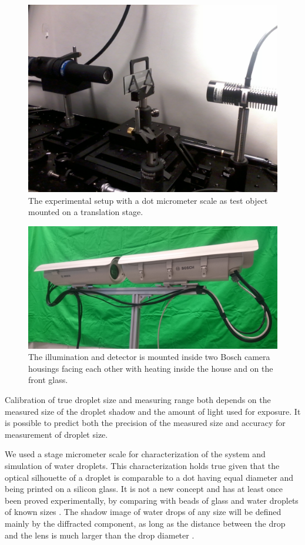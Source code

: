 \begin{figure}[ht]
\centering\includegraphics[width=0.75\linewidth]{figures/Foto0169}
\caption{The experimental setup with a dot micrometer scale as test object mounted on a translation stage.}
\end{figure}

\begin{figure}[ht]
\centering\includegraphics[width=0.75\linewidth]{figures/cam_housings}
\caption{The illumination and detector is mounted inside two Bosch camera housings facing each other with heating inside the house and on the front glass.}
\end{figure}

Calibration of true droplet size and measuring range both depends on the measured size of the droplet shadow and the amount of light used for exposure. It is possible to predict both the precision of the measured size and accuracy for measurement of droplet size. 

We used a stage micrometer scale for characterization of the system and simulation of water droplets. This characterization holds true given that the optical silhouette of a droplet is comparable to a dot having equal diameter and being printed on a silicon glass. It is not a new concept and has at least once been proved experimentally, by comparing with beads of glass and water droplets of known sizes \cite{koro1991,koro1998}. The shadow image of water drops of any size will be defined mainly by the diffracted component, as long as the distance between the drop and the lens is much larger than the drop diameter \cite{koro1991,wend2013}. 

